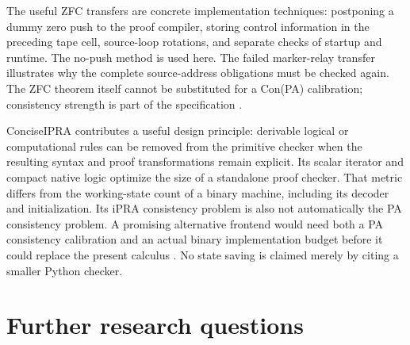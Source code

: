 \documentclass[11pt,letterpaper]{article}
\begin{document}
The useful ZFC transfers are concrete implementation techniques: postponing a
dummy zero push to the proof compiler, storing control information in the
preceding tape cell, source-loop rotations, and separate checks of startup and
runtime. The no-push method is used here. The failed marker-relay transfer
illustrates why the complete source-address obligations must be checked again.
The ZFC theorem itself cannot be substituted for a Con(PA) calibration;
consistency strength is part of the specification \cite{zfc}.

ConciseIPRA contributes a useful design principle: derivable logical or
computational rules can be removed from the primitive checker when the resulting
syntax and proof transformations remain explicit. Its scalar iterator and
compact native logic optimize the size of a standalone proof checker.
That metric differs from the working-state count of a binary machine,
including its decoder and initialization. Its iPRA consistency problem is
also not automatically the PA consistency problem. A promising alternative
frontend would need both a PA consistency calibration and an actual binary
implementation budget before it could replace the present calculus
\cite{ipra}. No state saving is claimed merely by citing a smaller Python checker.

\section{Further research questions}
\end{document}
